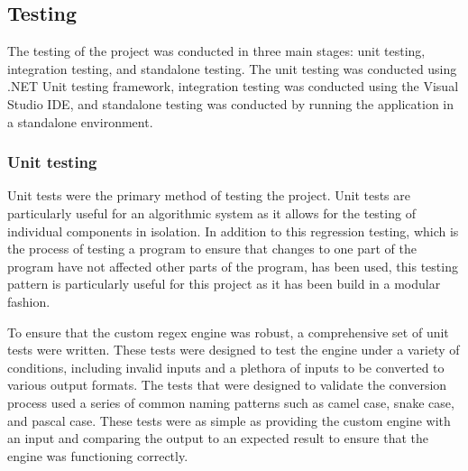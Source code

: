 \subsection{Testing}

The testing of the project was conducted in three main stages: unit testing, integration testing, and standalone testing. The unit testing was conducted using .NET Unit testing framework, integration testing was conducted using the Visual Studio IDE, and standalone testing was conducted by running the application in a standalone environment.

\subsubsection{Unit testing}
Unit tests were the primary method of testing the project. Unit tests are particularly useful for an algorithmic system as it allows for the testing of individual components in isolation. In addition to this regression testing, which is the process of testing a program to ensure that changes to one part of the program have not affected other parts of the program, has been used, this testing pattern is particularly useful for this project as it has been build in a modular fashion.

To ensure that the custom regex engine was robust, a comprehensive set of unit tests were written. These tests were designed to test the engine under a variety of conditions, including invalid inputs and a plethora of inputs to be converted to various output formats. The tests that were designed to validate the conversion process used a series of common naming patterns such as camel case, snake case, and pascal case. These tests were as simple as providing the custom engine with an input and comparing the output to an expected result to ensure that the engine was functioning correctly.

